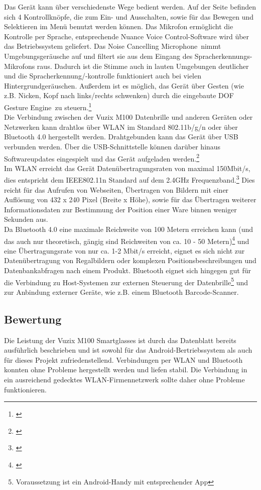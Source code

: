 Das Gerät kann über verschiedenste Wege bedient werden. Auf der Seite befinden sich 4 Kontrollknöpfe, die zum Ein- und Ausschalten, sowie für das Bewegen und Selektieren im Menü benutzt werden können. Das Mikrofon ermöglicht die Kontrolle per Sprache, entsprechende \glqq Nuance Voice Control\grqq -Software wird über das Betriebssystem geliefert. Das \glqq Noise Cancelling Microphone\grqq\ nimmt Umgebungsgeräusche auf und filtert sie aus dem Eingang des Spracherkennungs-Mikrofons raus. Dadurch ist die Stimme auch in lauten Umgebungen deutlicher und die Spracherkennung/-kontrolle funktioniert auch bei vielen Hintergrundgeräuschen. Außerdem ist es möglich, das Gerät über Gesten (wie z.B. Nicken, Kopf nach links/rechts schwenken) durch die eingebaute  DOF Gesture Engine\grqq\ zu steuern.\footnote{\citep{vuzixm100}}\\

Die Verbindung zwischen der Vuzix M100 Datenbrille und anderen Geräten oder Netzwerken kann drahtlos über WLAN im Standard 802.11b/g/n oder über Bluetooth 4.0 hergestellt werden. Drahtgebunden kann das Gerät über \ac{USB} verbunden werden. Über die \ac{USB}-Schnittstelle können darüber hinaus Softwareupdates eingespielt und das Gerät aufgeladen werden.\footnote{\citep{vuzixm100}}\\
Im \ac{WLAN} erreicht das Gerät Datenübertragungsraten von maximal 150Mbit/s, dies entspricht dem IEEE802.11n Standard auf dem 2.4GHz Frequenzband.\footnote{\citep{uebertragungsgeschwindigkeit}} Dies reicht für das Aufrufen von Webseiten, Übertragen von Bildern mit einer Auflösung von 432 x 240 Pixel (Breite x Höhe), sowie für das Übertragen weiterer Informationsdaten zur Bestimmung der Position einer Ware binnen weniger Sekunden aus.\\
Da Bluetooth 4.0 eine maximale Reichweite von 100 Metern erreichen kann (und das auch nur theoretisch, gängig sind Reichweiten von ca. 10 - 50 Metern)\footnote{\citep{bluetooth}} und eine Übertragungsrate von nur ca. 1-2 Mbit/s erreicht, eignet es sich nicht zur Datenübertragung von Regalbildern oder komplexen Positionsbeschreibungen und Datenbankabfragen nach einem Produkt. Bluetooth eignet sich hingegen gut für die Verbindung zu Host-Systemen zur externen Steuerung der Datenbrille\footnote{Voraussetzung ist ein Android-Handy mit entsprechender App} und zur Anbindung externer Geräte, wie z.B. einem Bluetooth Barcode-Scanner.

\subsection{Bewertung}
Die Leistung der Vuzix M100 Smartglasses ist durch das Datenblatt bereits ausführlich beschrieben und ist sowohl für das Android-Bertriebssystem als auch für dieses Projekt zufriedenstellend. Verbindungen per \ac{WLAN} und Bluetooth konnten ohne Probleme hergestellt werden und liefen stabil. Die Verbindung in ein ausreichend gedecktes \ac{WLAN}-Firmennetzwerk sollte daher ohne Probleme funktionieren.\\

